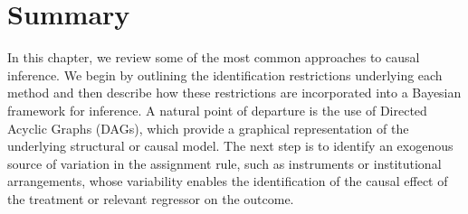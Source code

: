 \section{Summary}

In this chapter, we review some of the most common approaches to causal inference. We begin by outlining the identification restrictions underlying each method and then describe how these restrictions are incorporated into a Bayesian framework for inference. A natural point of departure is the use of Directed Acyclic Graphs (DAGs), which provide a graphical representation of the underlying structural or causal model. The next step is to identify an exogenous source of variation in the assignment rule, such as instruments or institutional arrangements, whose variability enables the identification of the causal effect of the treatment or relevant regressor on the outcome.

